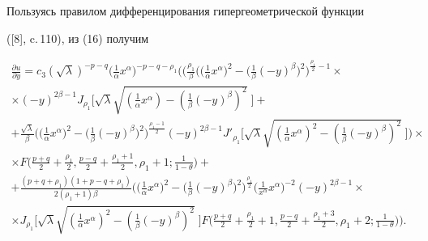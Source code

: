 Пользуясь правилом дифференцирования гипергеометрической функции 


([8], c.\,110), из (16) получим 


\begin{multline*} 


\frac{\partial u}{\partial y}=c_3(\sqrt{\lambda})^{-p-q}\bigg( 


\frac{1}{\alpha}x^\alpha\bigg)^{-p-q-\rho_1}\bigg(\bigg( 


\frac{\rho_1}{\beta}\bigg(\bigg(\frac{1}{\alpha}x^\alpha\bigg)^2- 


\bigg(\frac{1}{\beta}(-y)^\beta\bigg)^2\bigg)^{\frac{\rho_1}{2}-1}\times 


\\ 


% 


\times(-y)^{2\beta-1}J_{\rho_1}\Big[ 


\sqrt{\lambda}\sqrt{(\tfrac{1}{\alpha}x^\alpha)- 


(\tfrac{1}{\beta}(-y)^\beta)^2}\;\Big]+ \\ 


% 


+\frac{\sqrt{\lambda}}{\beta}\bigg(


\bigg(\frac{1}{\alpha}x^\alpha\bigg)^2 


-\bigg(\frac{1}{\beta}(-y)^\beta\bigg)^2\bigg)^{\frac{\rho_1-1}{2}} 


(-y)^{2\beta-1}J'_{\rho_1}\Big[\sqrt{\lambda} 


\sqrt{(\tfrac{1}{\alpha}x^\alpha)^2- 


(\tfrac{1}{\beta}(-y)^\beta)^2}\;\Big]\bigg) 


\times\\ 


% 


\times F\bigg(\frac{p+q}{2}+\frac{\rho_1}{2},\frac{p-q}{2}+ 


\frac{\rho_1+1}{2},\rho_1+1;\frac{1}{1-\theta}\bigg)+ \\ 


% 


+\frac{(p+q+\rho_1)(1+p-q+\rho_1)} 


{2(\rho_1+1)\beta}\bigg(\bigg(\frac{1}{\alpha}x^\alpha\bigg)^2 


-\bigg(\frac{1}{\beta}(-y)^\beta\bigg)^2\bigg)^{\frac{\rho_1}{2}} 


\bigg(\frac{1}{x^\alpha}x^\alpha\bigg)^{-2}(-y)^{2\beta-1}\times \\ 


% 


\times J_{\rho_1}\Big[\sqrt{\lambda}\sqrt{(\tfrac{1}{\alpha}x^\alpha)^2- 


(\tfrac{1}{\beta}(-y)^\beta)^2}\;\Big]F\bigg(\frac{p+q}{2}+ 


\frac{\rho_1}{2}+1,\frac{p-q}{2}+\frac{\rho_1+3}{2}, 


\rho_1+2;\frac{1}{1-\theta}\bigg)\bigg). 


\end{multline*} 


